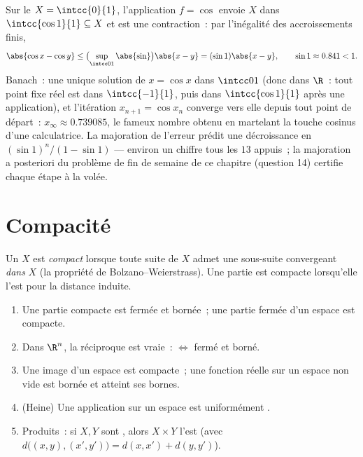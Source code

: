 \begin{example}[Un point fixe numérique~: $x = \cos x$]\label{ex:b2:metric:cosfix}
Sur le  $X = \intcc{0}{1}$, l'application $f = \cos$ envoie
$X$ dans $\intcc{\cos 1}{1} \subseteq X$ et est une contraction~: par
l'inégalité des accroissements finis,
\[
\abs{\cos x - \cos y} \leq \bigl(\sup_{\intcc01}\abs{\sin}\bigr)
\abs{x - y} = (\sin 1)\abs{x - y},
\qquad \sin 1 \approx 0.841 < 1 .
\]
Banach~: une unique solution de $x = \cos x$ dans $\intcc01$ (donc
dans $\R$~: tout point fixe réel est dans $\intcc{-1}{1}$, puis dans
$\intcc{\cos 1}{1}$ après une application), et l'itération $x_{n+1} =
\cos x_n$ converge vers elle depuis tout point de départ~: $x_\infty
\approx 0.739085$, le fameux nombre obtenu en martelant la touche
cosinus d'une calculatrice. La majoration de l'erreur prédit une
décroissance en $(\sin1)^n/(1 - \sin1)$ --- environ un chiffre tous
les $13$ appuis~; la majoration a posteriori du problème de fin de
semaine de ce chapitre (question 14) certifie chaque étape à la
volée.
\end{example}

\section{Compacité}

\begin{definition}\label{def:b2:metric:compact}
Un  $X$ est \emph{compact} lorsque toute suite de $X$ admet une sous-suite convergeant
\emph{dans} $X$ (la propriété de Bolzano--Weierstrass). Une partie est
compacte lorsqu'elle l'est pour la distance induite.
\end{definition}

\begin{theorem}\label{thm:b2:metric:compactprops}
\begin{enumerate}
  \item Une partie compacte est fermée et bornée~; une partie fermée
        d'un espace  est compacte.
  \item Dans $\R^n$, la réciproque est vraie~:  $\iff$ fermé
        et borné.
  \item Une image  d'un espace  est compacte~; une
        fonction réelle  sur un espace  non vide est
        bornée et atteint ses bornes.
  \item (Heine) Une application  sur un espace  est
        uniformément .
  \item Produits~: si $X, Y$ sont , alors $X \times Y$ l'est
        (avec $d\bigl((x,y),(x',y')\bigr) = d(x,x') + d(y,y')$).
\end{enumerate}
\end{theorem}

